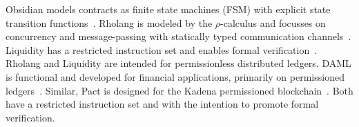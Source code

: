 Obsidian models contracts as finite state machines (FSM) with explicit state transition functions~\cite{Coblenz2017}.
Rholang is modeled by the $\rho$-calculus and focusses on concurrency and message-passing with statically typed communication channels~\cite{Meredith2018}.
Liquidity has a restricted instruction set and enables formal verification~\cite{OCamlProSAS2018}.
Rholang and Liquidity are intended for permissionless distributed ledgers.
DAML is functional and developed for financial applications, primarily on permissioned ledgers~\cite{Meier2018,Lippmeier2018}.
Similar, Pact is designed for the Kadena permissioned blockchain~\cite{Popejoy2017}.
Both have a restricted instruction set and with the intention to promote formal verification.


